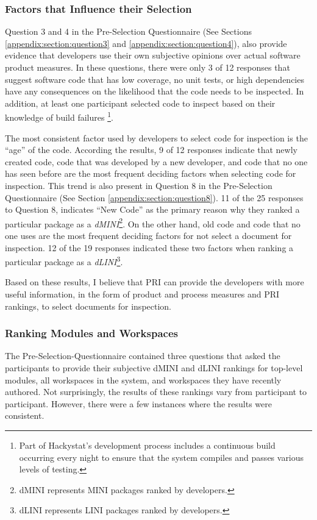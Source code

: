 \subsubsection{Factors that Influence their Selection}
Question 3 and 4 in the Pre-Selection Questionnaire (See Sections
\ref{appendix:section:question3} and \ref{appendix:section:question4}), also provide
evidence that developers use their own subjective opinions over actual
software product measures. In these questions, there were only 3 of 12
responses that suggest software code that has low coverage, no unit tests,
or high dependencies have any consequences on the likelihood that the code
needs to be inspected. In addition, at least one participant selected code
to inspect based on their knowledge of build failures \footnote{Part of
  Hackystat's development process includes a continuous build occurring
  every night to ensure that the system compiles and passes various levels
  of testing.}.

The most consistent factor used by developers to select code for inspection
is the ``age'' of the code. According the results, 9 of 12 responses
indicate that newly created code, code that was developed by a new
developer, and code that no one has seen before are the most frequent
deciding factors when selecting code for inspection. This trend is also
present in Question 8 in the Pre-Selection Questionnaire (See Section
\ref{appendix:section:question8}). 11 of the 25 responses to Question 8,
indicates ``New Code'' as the primary reason why they ranked a particular
package as a \textit{dMINI}\footnote{dMINI represents MINI packages ranked
  by developers.}. On the other hand, old code and code that no
one uses are the most frequent deciding factors for not select a document
for inspection. 12 of the 19 responses indicated these two factors when
ranking a particular package as a \textit{dLINI}\footnote{dLINI represents
  LINI packages ranked by developers.}.

Based on these results, I believe that PRI can provide the developers with
more useful information, in the form of product and process measures and
PRI rankings, to select documents for inspection.

\subsubsection{Ranking Modules and Workspaces}
The Pre-Selection-Questionnaire contained three questions that asked the
participants to provide their subjective dMINI and dLINI rankings for
top-level modules, all workspaces in the system, and workspaces they have
recently authored. Not surprisingly, the results of these rankings vary
from participant to participant. However, there were a few instances where
the results were consistent.


